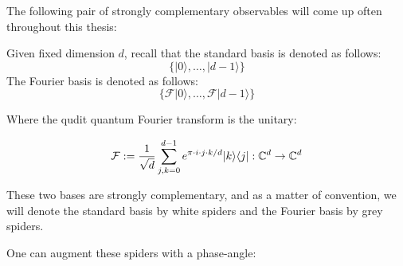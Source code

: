 The following pair of strongly complementary observables will come up often throughout this thesis:

\begin{example}
Given fixed dimension $d$, recall that the standard basis is denoted as follows:
$$\{ |0\rangle, \ldots, |d-1\rangle \}$$
The Fourier basis is denoted as follows:
$$\{ \mathcal{F}|0\rangle, \ldots, \mathcal{F}|d-1\rangle \}$$

Where the qudit quantum Fourier transform is the unitary:

$$\mathcal{F} := \dfrac{1}{\sqrt{d}} \sum_{j,k=0}^{d-1} e^{\pi\cdot i \cdot j \cdot k/d} | k\rangle \langle j |:\mathbb{C}^d\to \mathbb{C}^d $$


These two bases are strongly complementary, and as a matter of convention, we will denote the standard basis by white spiders and the Fourier basis by grey spiders.
\end{example}

One can augment these spiders with a phase-angle:

